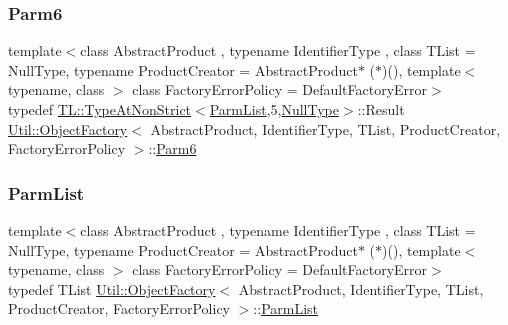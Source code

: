 \subsubsection{\texorpdfstring{Parm6}{Parm6}\hspace{0.1cm}{\footnotesize\ttfamily [2/2]}}
{\footnotesize\ttfamily template$<$class Abstract\+Product , typename Identifier\+Type , class T\+List  = Null\+Type, typename Product\+Creator  = Abstract\+Product$\ast$ ($\ast$)(), template$<$ typename, class $>$ class Factory\+Error\+Policy = Default\+Factory\+Error$>$ \\
typedef \mbox{\hyperlink{structUtil_1_1TL_1_1TypeAtNonStrict}{T\+L\+::\+Type\+At\+Non\+Strict}}$<$\mbox{\hyperlink{classUtil_1_1ObjectFactory_a46f003a5928e8a60140e0a74ac261c36}{Parm\+List}},5,\mbox{\hyperlink{classUtil_1_1NullType}{Null\+Type}}$>$\+::Result \mbox{\hyperlink{classUtil_1_1ObjectFactory}{Util\+::\+Object\+Factory}}$<$ Abstract\+Product, Identifier\+Type, T\+List, Product\+Creator, Factory\+Error\+Policy $>$\+::\mbox{\hyperlink{classUtil_1_1ObjectFactory_a9f80d25e0964c0e4c204373cd651397a}{Parm6}}}

\mbox{\label{classUtil_1_1ObjectFactory_a46f003a5928e8a60140e0a74ac261c36}} 
\subsubsection{\texorpdfstring{ParmList}{ParmList}\hspace{0.1cm}{\footnotesize\ttfamily [1/2]}}
{\footnotesize\ttfamily template$<$class Abstract\+Product , typename Identifier\+Type , class T\+List  = Null\+Type, typename Product\+Creator  = Abstract\+Product$\ast$ ($\ast$)(), template$<$ typename, class $>$ class Factory\+Error\+Policy = Default\+Factory\+Error$>$ \\
typedef T\+List \mbox{\hyperlink{classUtil_1_1ObjectFactory}{Util\+::\+Object\+Factory}}$<$ Abstract\+Product, Identifier\+Type, T\+List, Product\+Creator, Factory\+Error\+Policy $>$\+::\mbox{\hyperlink{classUtil_1_1ObjectFactory_a46f003a5928e8a60140e0a74ac261c36}{Parm\+List}}}

